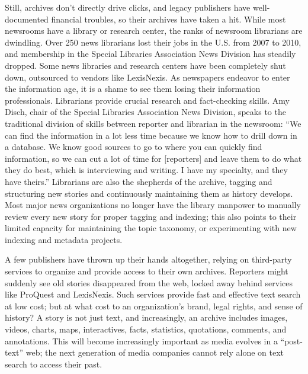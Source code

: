 Still, archives don't directly drive clicks, and legacy publishers have well-documented financial troubles, so their archives have taken a hit. While most newsrooms have a library or research center, the ranks of newsroom librarians are dwindling. Over 250 news librarians lost their jobs in the U.S. from 2007 to 2010, and membership in the Special Libraries Association News Division has steadily dropped. Some news libraries and research centers have been completely shut down, outsourced to vendors like LexisNexis.\autocite{silverman_endangered_2010} As newspapers endeavor to enter the information age, it is a shame to see them losing their information professionals. Librarians provide crucial research and fact-checking skills. Amy Disch, chair of the Special Libraries Association News Division, speaks to the traditional division of skills between reporter and librarian in the newsroom: ``We can find the information in a lot less time because we know how to drill down in a database. We know good sources to go to where you can quickly find information, so we can cut a lot of time for [reporters] and leave them to do what they do best, which is interviewing and writing. I have my specialty, and they have theirs.''\autocite{silverman_endangered_2010} Librarians are also the shepherds of the archive, tagging and structuring new stories and continuously maintaining them as history develops. Most major news organizations no longer have the library manpower to manually review every new story for proper tagging and indexing; this also points to their limited capacity for maintaining the topic taxonomy, or experimenting with new indexing and metadata projects.


A few publishers have thrown up their hands altogether, relying on third-party services to organize and provide access to their own archives.\autocite{romenesko_u.s._2014} Reporters might suddenly see old stories disappeared from the web, locked away behind services like ProQuest and LexisNexis. Such services provide fast and effective text search at low cost; but at what cost to an organization's brand, legal rights, and sense of history? A story is not just text, and increasingly, an archive includes images, videos, charts, maps, interactives, facts, statistics, quotations, comments, and annotations. This will become increasingly important as media evolves in a ``post-text'' web; the next generation of media companies cannot rely alone on text search to access their past.\autocite{salmon_why_2014}


